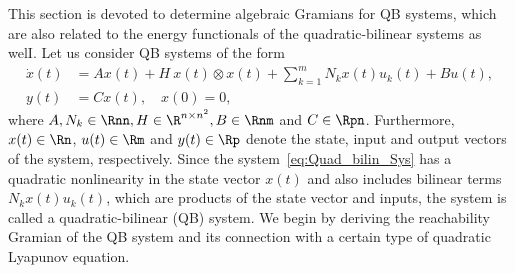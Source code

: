 This section is devoted to determine  algebraic Gramians for QB systems, which are also related to the energy functionals of the quadratic-bilinear systems as welI. Let us consider  QB systems of the form
\begin{subequations}\label{eq:Quad_bilin_Sys}
\begin{align}
 \dot{x}(t) &= Ax(t) + H~x(t)\otimes x(t) + \sum_{k = 1}^mN_kx(t)u_k(t) +  Bu(t),\label{eq:QB_differential}\\
 y(t) &= Cx(t),\quad x(0) = 0,\label{eq:QB_output}
 \end{align}
\end{subequations}
where $A,N_k\in \Rnn, H\in\R^{n\times n^2}, B \in \Rnm$ and $C\in \Rpn$. Furthermore, $x(t) \in \Rn$, $u(t)\in \Rm$ and $y(t) \in \Rp$ denote the state, input and output vectors of the system, respectively. Since the system~\eqref{eq:Quad_bilin_Sys} has a quadratic nonlinearity in the state vector $x(t)$ and also includes  bilinear terms $N_kx(t)u_k(t)$, which are products of the state vector and inputs, the system is called a quadratic-bilinear (QB) system. 
We begin by deriving  the reachability Gramian of  the QB system  and its connection with a certain type of  quadratic Lyapunov equation.


